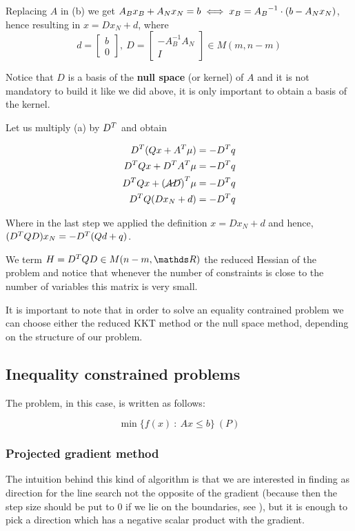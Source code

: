 \documentclass[ComputationalMathematics.tex]{subfiles}
\begin{document}
\begin{description}
    Replacing $A$ in (b) we get $A_B x_B + A_N x_N = b \iff x_B = {A_B}^{-1} \cdot (b - A_N x_N)$, hence resulting in $x = D x_N + d$, where
    \[
    d = \left[\begin{array}{c} b \\ 0 \end{array}\right],~D = \left[\begin{array}{c} - A_B^{-1} A_N \\ I \end{array}\right]
      \in M(m, n-m)
    \]

    Notice that $D$ is a basis of the \textbf{null space} (or kernel) of $A$ and it is not mandatory to build it like we did above, it is only important to obtain a basis of the kernel.

    Let us multiply (a) by ${D}^{T}$ and obtain

    \begin{equation}
    \begin{split}
      {D}^{T}(Qx + {A}^{T}\mu) &= - {D}^{T} q\\
      {D}^{T}Qx + {D}^{T}{A}^{T}\mu &= - {D}^{T} q\\
      {D}^{T}Qx + {(\cancel{AD})}^{T}\mu &= - {D}^{T} q\\
      {D}^{T}Q (D x_N + d) &= -{D}^{T} q
    \end{split}
    \end{equation}

    Where in the last step we applied the definition $x = Dx_N + d$ and hence, $(D^T Q D) x_N = - {D}^{T} (Q d + q)$.

    We term $H=\tr{D}QD \in M(n-m, \R)$ the reduced Hessian of the problem and notice that whenever the number of constraints is close to the number of variables this matrix is very small.
\end{description}

It is important to note that in order to solve an equality contrained problem we can choose either the reduced KKT method or the null space method, depending on the structure of our problem.

\subsection{Inequality constrained problems}

The problem, in this case, is written as follows:

\[
\min \{f(x)~:~Ax \leq b\}~(P)
\]

\subsubsection{Projected gradient method}
The intuition behind this kind of algorithm is that we are interested in finding as direction for the line search not the opposite of the gradient (because then the step size should be put to $0$ if we lie on the boundaries, see ), but it is enough to pick a direction which has a negative scalar product with the gradient.
\end{document}
